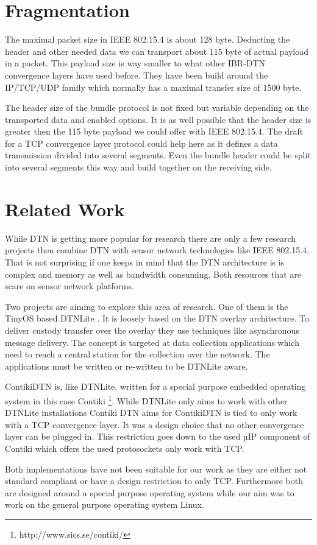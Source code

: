 \section{Fragmentation}

The maximal packet size in IEEE 802.15.4 is about 128 byte. Deducting the header
and other needed data we can transport about 115 byte of actual payload in a
packet. This payload size is way smaller to what other IBR-DTN convergence
layers have used before. They have been build around the IP/TCP/UDP family which
normally has a maximal transfer size of 1500 byte.

The header size of the bundle protocol is not fixed but variable depending on
the transported data and enabled options. It is as well possible that the header
size is greater then the 115 byte payload we could offer with IEEE 802.15.4. The
draft \cite{tcp-clayer-draft} for a TCP convergence layer protocol could help here as it
defines a data transmission divided into several segments. Even the bundle
header could be split into several segments this way and build together on the
receiving side.

\section{Related Work}
\label{relatedwork}

While DTN is getting more popular for research there are only a few research
projects then combine DTN with sensor network technologies like IEEE 802.15.4.
That is not surprising if one keeps in mind that the DTN architecture is is
complex and memory as well as bandwidth consuming. Both resources that are scare
on sensor network platforms.

Two projects are aiming to explore this area of research. One of them is the
TinyOS based DTNLite \cite{dtnlite}. It is loosely based on the DTN overlay
architecture. To deliver custody transfer over the overlay they use techniques
like asynchronous message delivery. The concept is targeted at data collection
applications which need to reach a central station for the collection over the
network. The applications must be written or re-written to be DTNLite aware.

ContikiDTN \cite{contikidtn} is, like DTNLite, written for a special purpose embedded operating
system in this case Contiki \footnote{http://www.sics.se/contiki/}. While
DTNLite only aims to work with other DTNLite installations Contiki DTN aims for
ContikiDTN is tied to only work with a TCP convergence layer. It was a design
choice that no other convergence layer can be plugged in. This restriction goes
down to the used µIP component of Contiki which offers the used protosockets
only work with TCP.

Both implementations have not been suitable for our work as they are either not
standard compliant or have a design restriction to only TCP. Furthermore both
are designed around a special purpose operating system while our aim was to work
on the general purpose operating system Linux.
